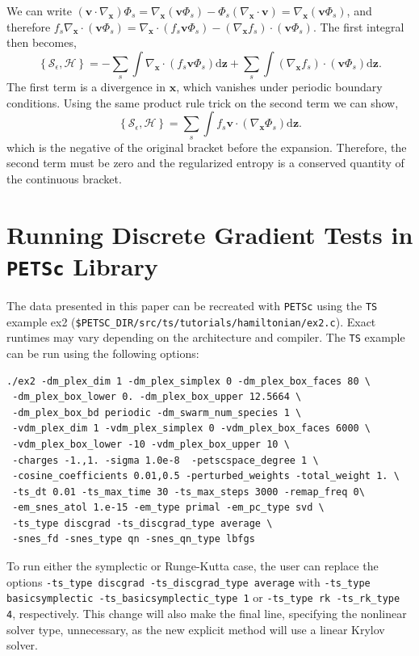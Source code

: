 \documentclass[preprint,12pt]{elsarticle}
\theoremstyle{definition}
\begin{document}
We can write $(\boldsymbol{v} \cdot \nabla_{\boldsymbol{x}}) \Phi_s = \nabla_{\boldsymbol{x}} (\boldsymbol{v} \Phi_s) - \Phi_s (\nabla_{\boldsymbol{x}} \cdot \boldsymbol{v})= \nabla_{\boldsymbol{x}} (\boldsymbol{v} \Phi_s)$, and therefore $ f_s \nabla_{\boldsymbol{x}} \cdot (\boldsymbol{v} \Phi_s) = \nabla_{\boldsymbol{x}} \cdot (f_s  \boldsymbol{v} \Phi_s) - (\nabla_{\boldsymbol{x}} f_s) \cdot (\boldsymbol{v} \Phi_s)$. The first integral then becomes, 
\begin{equation*}
    \left\{\mathcal{S}_{\epsilon},\mathcal{H}\right\}  = -\sum_s \int \nabla_{\boldsymbol{x}} \cdot (f_s  \boldsymbol{v} \Phi_s) \mathrm{d} \boldsymbol{z} + \sum_s \int (\nabla_{\boldsymbol{x}} f_s) \cdot (\boldsymbol{v} \Phi_s) \mathrm{d} \boldsymbol{z}.
\end{equation*}
The first term is a divergence in $\boldsymbol{x}$, which vanishes under periodic boundary conditions. Using the same product rule trick on the second term we can show,
\begin{equation*}
    \left\{\mathcal{S}_{\epsilon},\mathcal{H}\right\} = \sum_s \int f_s \boldsymbol{v} \cdot (\nabla_{\boldsymbol{x}} \Phi_s) \mathrm{d} \boldsymbol{z}.
\end{equation*}
which is the negative of the original bracket before the expansion. Therefore, the second term must be zero and the regularized entropy is a conserved quantity of the continuous bracket.

\section{Running Discrete Gradient Tests in \texttt{PETSc} Library}

The data presented in this paper can be recreated with \texttt{PETSc} using the \texttt{TS} example ex2 (\texttt{\$PETSC\_DIR/src/ts/tutorials/hamiltonian/ex2.c}). Exact runtimes may vary depending on the architecture and compiler. The \texttt{TS} example can be run using the following options:
\begin{verbatim}
./ex2 -dm_plex_dim 1 -dm_plex_simplex 0 -dm_plex_box_faces 80 \
 -dm_plex_box_lower 0. -dm_plex_box_upper 12.5664 \
 -dm_plex_box_bd periodic -dm_swarm_num_species 1 \
 -vdm_plex_dim 1 -vdm_plex_simplex 0 -vdm_plex_box_faces 6000 \
 -vdm_plex_box_lower -10 -vdm_plex_box_upper 10 \
 -charges -1.,1. -sigma 1.0e-8  -petscspace_degree 1 \
 -cosine_coefficients 0.01,0.5 -perturbed_weights -total_weight 1. \
 -ts_dt 0.01 -ts_max_time 30 -ts_max_steps 3000 -remap_freq 0\
 -em_snes_atol 1.e-15 -em_type primal -em_pc_type svd \
 -ts_type discgrad -ts_discgrad_type average \
 -snes_fd -snes_type qn -snes_qn_type lbfgs 
\end{verbatim}
To run either the symplectic or Runge-Kutta case, the user can replace the options \texttt{-ts\_type discgrad -ts\_discgrad\_type average} with \texttt{-ts\_type basicsymplectic -ts\_basicsymplectic\_type 1}
or \texttt{-ts\_type rk -ts\_rk\_type 4}, respectively. This change will also make the final line, specifying the nonlinear solver type, unnecessary, as the new explicit method will use a linear Krylov solver.
\end{document}
